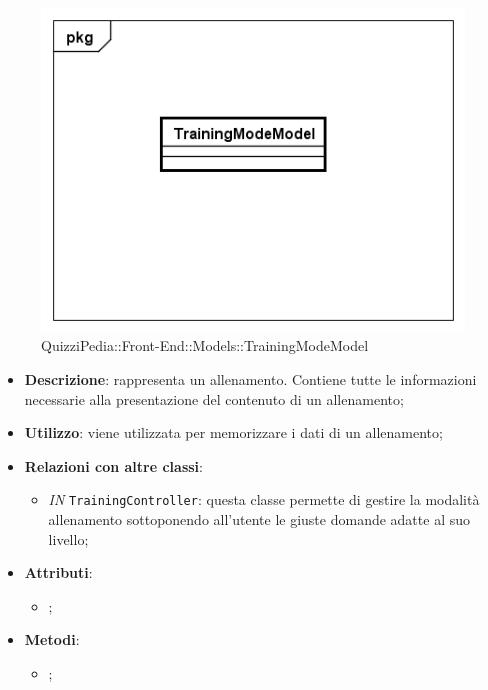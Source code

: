 		\begin{figure}[ht]
			\centering
			\includegraphics[scale=0.5,keepaspectratio]{UML/Classi/Front-End/QuizziPedia_Front-end_Models_TrainingModeModel.png}
			\caption{QuizziPedia::Front-End::Models::TrainingModeModel}
		\end{figure} \FloatBarrier
		
		\begin{itemize}
			\item \textbf{Descrizione}: rappresenta un allenamento. Contiene tutte le informazioni necessarie alla
			presentazione del contenuto di un allenamento;
			\item \textbf{Utilizzo}: viene utilizzata per memorizzare i dati di un allenamento;
			\item \textbf{Relazioni con altre classi}: 
			\begin{itemize}
				\item \textit{IN} \texttt{TrainingController}: questa classe permette di gestire la modalità allenamento sottoponendo all'utente le giuste domande adatte al suo livello;
			\end{itemize}
			\item \textbf{Attributi}: 
			\begin{itemize}
				\item ;
			\end{itemize}
			\item \textbf{Metodi}: 
			\begin{itemize}
				\item ;
			\end{itemize}
		\end{itemize}
			
